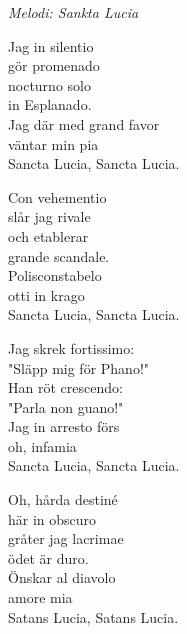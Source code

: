 {\footnotesize\textit{Melodi: Sankta Lucia}}\par
\vspace{10pt}
Jag in silentio\\
gör promenado\\
nocturno solo\\
in Esplanado.\\
Jag där med grand favor\\
väntar min pia\\
Sancta Lucia, Sancta Lucia.\par
\newpage
Con vehementio\\
slår jag rivale\\
och etablerar\\
grande scandale.\\
Polisconstabelo\\
otti in krago\\
Sancta Lucia, Sancta Lucia.\par
\vspace{10pt}
Jag skrek fortissimo:\\
"Släpp mig för Phano!"\\
Han röt crescendo:\\
"Parla non guano!"\\
Jag in arresto förs\\
oh, infamia\\
Sancta Lucia, Sancta Lucia.\par
\vspace{10pt}
Oh, hårda destiné\\
här in obscuro\\
gråter jag lacrimae\\
ödet är duro.\\
Önskar al diavolo\\
amore mia\\
Satans Lucia, Satans Lucia.
